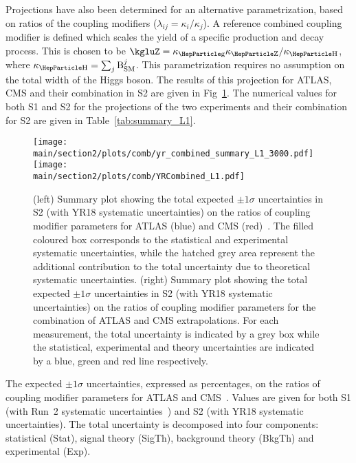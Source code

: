 Projections have also been determined for an alternative parametrization, based on ratios of the coupling modifiers ($\lambda_{ij} = \kappa_{i}/\kappa_{j}$). A reference combined coupling modifier is defined which scales the yield of a specific production and decay process. This is chosen to be $\kgluZ = \kglu\kZ/\kH$, where $\kH=\sum_{j}\mathrm{B}^{j}_{\text{SM}}$.
This parametrization requires no assumption on the total width of the Higgs boson. The results of this projection for ATLAS, CMS and their combination in S2 are given in Fig~\ref{fig:summary_L1}.
The numerical values for both S1 and S2 for the projections of the two experiments and their combination for S2 are given in Table~\ref{tab:summary_L1}.
\begin{figure}[hbtp]
\centering
\texttt{[image: \\main/section2/plots/comb/yr\_combined\_summary\_L1\_3000.pdf]}%
\texttt{[image: \\main/section2/plots/comb/YRCombined\_L1.pdf]}%
\caption{(left) Summary plot showing the total expected $\pm 1\sigma$ uncertainties in S2 (with YR18 systematic uncertainties) on the ratios of coupling modifier parameters  for ATLAS (blue)  and CMS (red)~\cite{CMS-PAS-FTR-18-011}. The filled coloured box corresponds to the statistical and experimental systematic uncertainties, while the hatched grey area represent the additional contribution to the total uncertainty due to theoretical systematic uncertainties.
(right) Summary plot showing the total expected $\pm 1\sigma$  uncertainties in S2 (with YR18 systematic uncertainties) on the ratios of coupling modifier parameters  for the combination of ATLAS and CMS extrapolations. For each measurement,  the total uncertainty is indicated by a grey box while the statistical, experimental and theory uncertainties are indicated by a blue, green and red line respectively.}
\label{fig:summary_L1}
\end{figure}


\begin{table}[hbtp]
\centering
\caption{The expected $\pm 1\sigma$ uncertainties, expressed as percentages, on the ratios of coupling modifier parameters for ATLAS and CMS~\cite{CMS-PAS-FTR-18-011}.  Values are given for both S1 (with Run~2 systematic uncertainties~\cite{Sirunyan:2018koj}) and S2 (with YR18 systematic uncertainties). The total uncertainty is decomposed into four components: statistical (Stat), signal theory (SigTh), background theory (BkgTh) and experimental (Exp).}
\small
\hspace{0.5cm}

\label{tab:summary_L1}
\vspace{0.5cm}
\end{table}